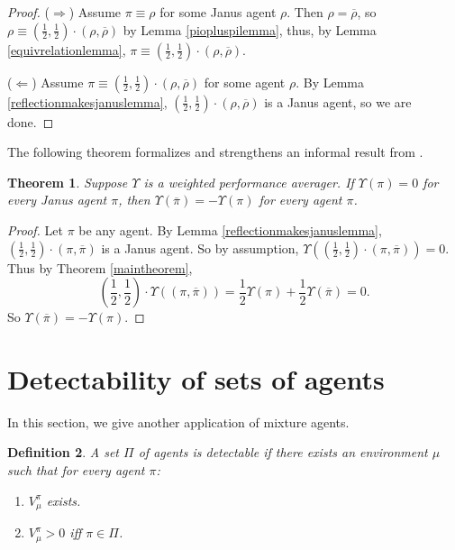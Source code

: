 \documentclass{article}
\newtheorem{theorem}{Theorem}
\newtheorem{definition}[theorem]{Definition}
\begin{document}
\begin{proof}
    ($\Rightarrow$)
    Assume $\pi\equiv\rho$ for some Janus agent $\rho$.
    Then $\rho=\overline{\rho}$, so
    $\rho\equiv (\frac12,\frac12)\cdot(\rho,\overline{\rho})$ by
    Lemma \ref{piopluspilemma}, thus, by Lemma \ref{equivrelationlemma},
    $\pi\equiv(\frac12,\frac12)\cdot(\rho,\overline{\rho})$.

    ($\Leftarrow$)
    Assume $\pi\equiv(\frac12,\frac12)\cdot(\rho,\overline{\rho})$ for some agent $\rho$.
    By Lemma \ref{reflectionmakesjanuslemma},
    $(\frac12,\frac12)\cdot(\rho,\overline{\rho})$ is a Janus agent, so we are done.
\end{proof}

The following theorem formalizes and strengthens an informal result
from \cite{alexander2021reward}.

\begin{theorem}
    Suppose $\Upsilon$ is a weighted performance averager.
    If $\Upsilon(\pi)=0$ for every Janus agent $\pi$,
    then $\Upsilon(\overline{\pi})=-\Upsilon(\pi)$
    for every agent $\pi$.
\end{theorem}

\begin{proof}
    Let $\pi$ be any agent.
    By Lemma \ref{reflectionmakesjanuslemma},
    $(\frac12,\frac12)\cdot(\pi,\overline\pi)$ is a Janus agent.
    So by assumption,
    $\Upsilon((\frac12,\frac12)\cdot(\pi,\overline\pi))=0$.
    Thus by Theorem \ref{maintheorem},
    \[
        (\mbox{$\frac12$},\mbox{$\frac12$})\cdot\Upsilon((\pi,\overline\pi))
        =\mbox{$\frac12$}\Upsilon(\pi)+\mbox{$\frac12$}\Upsilon(\overline\pi)=0.
    \]
    So $\Upsilon(\overline{\pi})=-\Upsilon(\pi)$.
\end{proof}


\section{Detectability of sets of agents}

In this section, we give another application of mixture agents.

\begin{definition}
\label{incentivizabilitydefn}
    A set $\Pi$ of agents is \emph{detectable} if there exists
    an environment $\mu$ such that for every agent $\pi$:
    \begin{enumerate}
        \item
        $V^\pi_\mu$ exists.
        \item
        $V^\pi_\mu>0$ iff $\pi\in\Pi$.
    \end{enumerate}
\end{definition}
\end{document}
